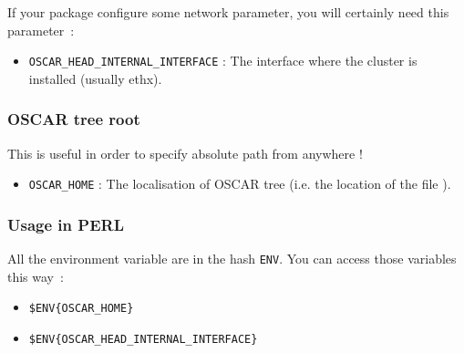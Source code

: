 If your package configure some network parameter, you will certainly need this
parameter~:
\begin{itemize}
\item \verb+OSCAR_HEAD_INTERNAL_INTERFACE+ : The interface where the cluster
is installed (usually ethx).
\end{itemize}

\subsubsection{OSCAR tree root}

This is useful in order to specify absolute path from anywhere !
\begin{itemize}
\item \verb+OSCAR_HOME+ : The localisation of OSCAR tree (i.e. the location of
the file ).
\end{itemize}

\subsubsection{Usage in PERL}

All the environment variable are in the hash \verb+ENV+. You can access those
variables this way~:
\begin{itemize}
\item \verb+$ENV{OSCAR_HOME}+
\item \verb+$ENV{OSCAR_HEAD_INTERNAL_INTERFACE}+
\end{itemize}



